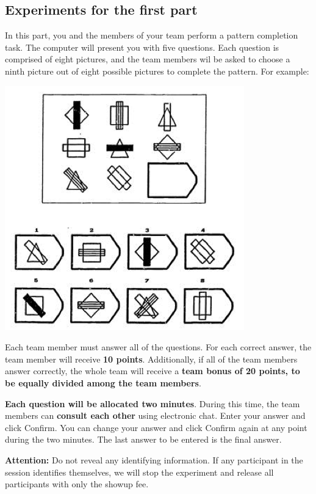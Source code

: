 \newpage

\subsection*{Experiments for the first part}

In this part, you and the members of your team perform a pattern completion task. The computer will present you with five questions. Each question is comprised of eight pictures, and the team members wil be asked to choose a ninth picture out of eight possible pictures to complete the pattern. For example:

\begin{center}
	\includegraphics[]{Raven.png}
\end{center}

Each team member must answer all of the questions. For each correct answer, the team member will receive \textbf{10 points}. Additionally, if all of the team members answer correctly, the whole team will receive a \textbf{team bonus of 20 points, to be equally divided among the team members}.

\textbf{Each question will be allocated two minutes}. During this time, the team members can \textbf{consult each other} using electronic chat. Enter your answer and click Confirm. You can change your answer and click Confirm again at any point during the two minutes. The last answer to be entered is the final answer.

\textbf{Attention:} Do not reveal any identifying information. If any participant in the session identifies themselves, we will stop the experiment and release all participants with only the showup fee.

